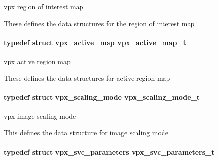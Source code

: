 vpx region of interest map 

These defines the data structures for the region of interest map \hypertarget{group__vp8__encoder_ga7b48f7962f5061979f0f8ece6fb1cba8}{
\paragraph[{vpx\+\_\+active\+\_\+map\+\_\+t}]{\setlength{\rightskip}{0pt plus 5cm}typedef struct {\bf vpx\+\_\+active\+\_\+map}  {\bf vpx\+\_\+active\+\_\+map\+\_\+t}}}\label{group__vp8__encoder_ga7b48f7962f5061979f0f8ece6fb1cba8}


vpx active region map 

These defines the data structures for active region map \hypertarget{group__vp8__encoder_ga9600359ed9096cd96c621d9cf6c8df38}{
\paragraph[{vpx\+\_\+scaling\+\_\+mode\+\_\+t}]{\setlength{\rightskip}{0pt plus 5cm}typedef struct {\bf vpx\+\_\+scaling\+\_\+mode}  {\bf vpx\+\_\+scaling\+\_\+mode\+\_\+t}}}\label{group__vp8__encoder_ga9600359ed9096cd96c621d9cf6c8df38}


vpx image scaling mode 

This defines the data structure for image scaling mode \hypertarget{group__vp8__encoder_gaf01e78e24ae1cb54e8a455d74f3c31c8}{
\paragraph[{vpx\+\_\+svc\+\_\+parameters\+\_\+t}]{\setlength{\rightskip}{0pt plus 5cm}typedef struct {\bf vpx\+\_\+svc\+\_\+parameters}  {\bf vpx\+\_\+svc\+\_\+parameters\+\_\+t}}}\label{group__vp8__encoder_gaf01e78e24ae1cb54e8a455d74f3c31c8}


